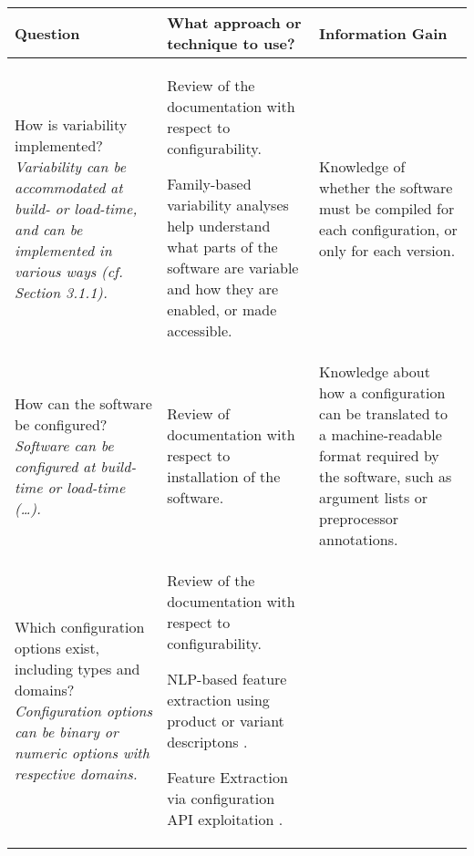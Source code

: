 \begin{sidewaystable}
  \centering
  
  \begin{tabular}{L{0.25\textwidth} L{0.45\textwidth} L{0.3\textwidth}}
  
  	\toprule 
    {\bf Question} & {\bf What approach or technique to use?} & {\bf
    Information Gain} \\
    \midrule
    {How is variability implemented?\linebreak
	{\footnotesize\it Variability can be accommodated at build- or
	load-time, and can be implemented in various ways (cf. Section 3.1.1).}} & 
	
	{\small\begin{compactitem}
	  \item Review of the documentation with respect to configurability.
	  \item Family-based variability analyses help understand what parts of the
	  software are variable and how they are enabled, or made accessible.	  
	\end{compactitem}} & 
	
	{Knowledge of whether the software must be compiled for each configuration, or only for each version.}\\
	
	\midrule
	
	{How can the software be configured?\linebreak
	{\footnotesize\it Software can be configured at build-time or load-time
	(\ldots).}} &
	
	{\small\begin{compactitem}
	  \item Review of documentation with respect to installation of the software.
	\end{compactitem}} & 
	
	{Knowledge about how a configuration can be translated to a machine-readable
	format required by the software, such as argument lists or preprocessor annotations.}\\
	
	\midrule
	
	{Which configuration options exist, including types and domains?\linebreak
	{\footnotesize\it Configuration options can be binary or numeric options with
	respective domains.}} & 
	
	{\small\begin{compactitem}
	  \item Review of the documentation with respect to configurability.
	  \item NLP-based feature extraction using product or variant descriptons
	  \citep{alves_exploratory_2008,bakar_feature_2015}.
	  \item Feature Extraction via configuration API exploitation
	  \citep{rabkin_static_2011} .
	\end{compactitem}} & 
	

\end{tabular}
\end{sidewaystable}
